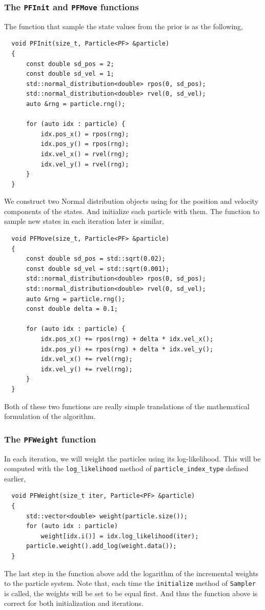 \subsubsection{The \texttt{PFInit} and \texttt{PFMove} functions}

The function that sample the state values from the prior is as the following,
\begin{Verbatim}
  void PFInit(size_t, Particle<PF> &particle)
  {
      const double sd_pos = 2;
      const double sd_vel = 1;
      std::normal_distribution<double> rpos(0, sd_pos);
      std::normal_distribution<double> rvel(0, sd_vel);
      auto &rng = particle.rng();

      for (auto idx : particle) {
          idx.pos_x() = rpos(rng);
          idx.pos_y() = rpos(rng);
          idx.vel_x() = rvel(rng);
          idx.vel_y() = rvel(rng);
      }
  }
\end{Verbatim}
We construct two Normal distribution objects using for the position and
velocity components of the states. And initialize each particle with them. The
function to sample new states in each iteration later is similar,
\begin{Verbatim}
  void PFMove(size_t, Particle<PF> &particle)
  {
      const double sd_pos = std::sqrt(0.02);
      const double sd_vel = std::sqrt(0.001);
      std::normal_distribution<double> rpos(0, sd_pos);
      std::normal_distribution<double> rvel(0, sd_vel);
      auto &rng = particle.rng();
      const double delta = 0.1;

      for (auto idx : particle) {
          idx.pos_x() += rpos(rng) + delta * idx.vel_x();
          idx.pos_y() += rpos(rng) + delta * idx.vel_y();
          idx.vel_x() += rvel(rng);
          idx.vel_y() += rvel(rng);
      }
  }
\end{Verbatim}
Both of these two functions are really simple translations of the mathematical
formulation of the algorithm.

\subsubsection{The \texttt{PFWeight} function}

In each iteration, we will weight the particles using its log-likelihood. This
will be computed with the \verb|log_likelihood| method of
\verb|particle_index_type| defined earlier,
\begin{Verbatim}
  void PFWeight(size_t iter, Particle<PF> &particle)
  {
      std::vector<double> weight(particle.size());
      for (auto idx : particle)
          weight[idx.i()] = idx.log_likelihood(iter);
      particle.weight().add_log(weight.data());
  }
\end{Verbatim}
The last step in the function above add the logarithm of the incremental
weights to the particle system. Note that, each time the \verb|initialize|
method of \verb|Sampler| is called, the weights will be set to be equal first.
And thus the function above is correct for both initialization and iterations.

